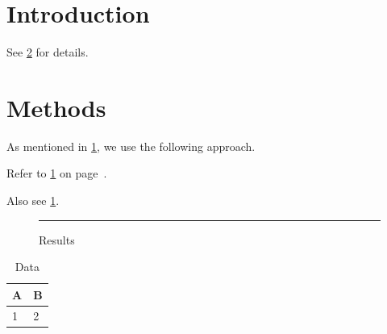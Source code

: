 \documentclass{article}
\begin{document}
\section{Introduction}
\label{sec:intro}

See \cref{sec:methods} for details.

\section{Methods}
\label{sec:methods}

As mentioned in \cref{sec:intro}, we use the following approach.

Refer to \cref{fig:results} on page~\pageref{fig:results}.

Also see \cref{tab:data}.

\begin{figure}[h]
\centering
\rule{5cm}{3cm}
\caption{Results}
\label{fig:results}
\end{figure}

\begin{table}[h]
\centering
\caption{Data}
\label{tab:data}
\begin{tabular}{ll}
\hline
A & B \\
\hline
1 & 2 \\
\hline
\end{tabular}
\end{table}
\end{document}
